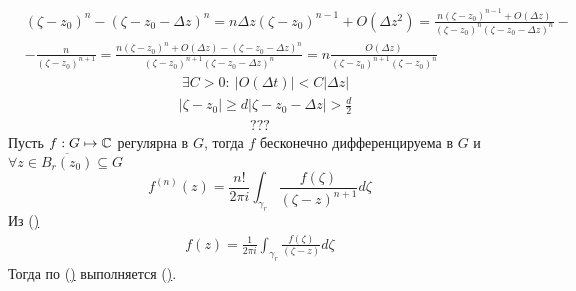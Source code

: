 \begin{align*}
  & (\zeta-z_0)^n - (\zeta - z_0 - \Delta z)^n = n\Delta z(\zeta - z_0)^{n-1} + O(\Delta z^2) = \frac{n(\zeta-z_0)^{n-1}+O(\Delta z)}{(\zeta - z_0)^n(\zeta-z_0-\Delta z)^n} - \\
  & - \frac{n}{(\zeta - z_0)^{n+1}} = \frac{n(\zeta-z_0)^n+O(\Delta z) - (\zeta-z_0-\Delta z)^n}{(\zeta - z_0)^{n+1}(\zeta - z_0 - \Delta z)^n} = n \frac{O(\Delta z)}{(\zeta - z_0)^{n+1}(\zeta - z_0)^n}
\end{align*}
\begin{align*}
  & \exists C > 0: \ \left| O(\Delta t) \right| < C \left| \Delta z \right|
\end{align*}
\begin{align*}
  & \left| \zeta - z_0 \right| \geq d \left| \zeta - z_0 - \Delta z \right| > \frac{d}{2}
\end{align*}
\begin{align*}
  ???
\end{align*}
\theorem
Пусть $f: G \mapsto \mathbb{C}$ регулярна в $G$, тогда $f$ бесконечно дифференцируема в
$G$ и $\forall z \in \overline{B_r(z_0)} \subseteq G$
\begin{equation} \label{(8.4)}
    f^{(n)}(z) = \frac{n!}{2 \pi i}\int_{\gamma_r}\frac{f(\zeta)}{(\zeta - z)^{n+1}}d\zeta
\end{equation}
\pr
Из (\href{(8.1)})
\begin{align*}
  f(z) = \frac{1}{2 \pi i}\int_{\gamma_r}\frac{f(\zeta)}{(\zeta - z)}d\zeta
\end{align*}
Тогда по (\href{(8.3)}) выполняется (\href{(8.4)}).





